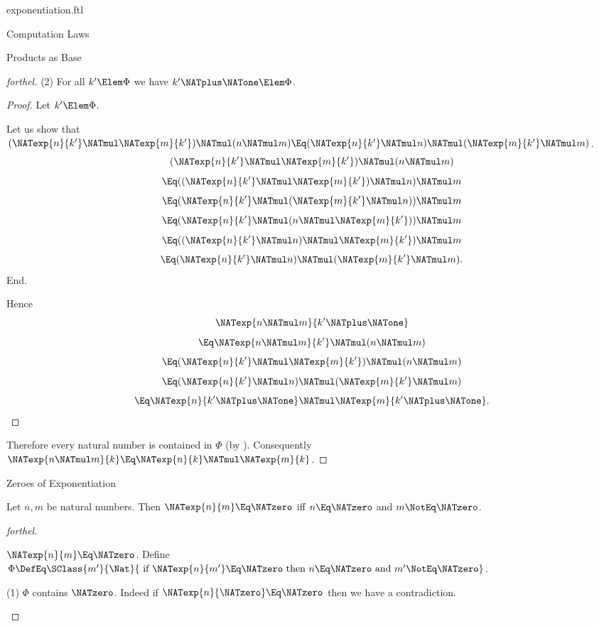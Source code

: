 \documentclass{stex}
\begin{document}
\begin{smodule}{exponentiation.ftl}
\begin{sfragment}{Computation Laws}
\begin{sfragment}{Products as Base}
\begin{proof}[forthel]
      (2) For all $k' \Elem \Phi$ we have $k' \NATplus \NATone \Elem \Phi$.
      \begin{proof}
        Let $k' \Elem \Phi$.

        Let us show that $(\NATexp{n}{k'} \NATmul \NATexp{m}{k'}) \NATmul (n \NATmul m) \Eq (\NATexp{n}{k'} \NATmul n) \NATmul (\NATexp{m}{k'} \NATmul m)$.
          \[  (\NATexp{n}{k'} \NATmul \NATexp{m}{k'}) \NATmul (n \NATmul m)       \]
          \[    \Eq ((\NATexp{n}{k'} \NATmul \NATexp{m}{k'}) \NATmul n) \NATmul m   \]
          \[    \Eq (\NATexp{n}{k'} \NATmul (\NATexp{m}{k'} \NATmul n)) \NATmul m   \]
          \[    \Eq (\NATexp{n}{k'} \NATmul (n \NATmul \NATexp{m}{k'})) \NATmul m   \]
          \[    \Eq ((\NATexp{n}{k'} \NATmul n) \NATmul \NATexp{m}{k'}) \NATmul m   \]
          \[    \Eq (\NATexp{n}{k'} \NATmul n) \NATmul (\NATexp{m}{k'} \NATmul m).  \]
        End.

        Hence
        \[  \NATexp{n \NATmul m}{k' \NATplus \NATone}                          \]
        \[    \Eq \NATexp{n \NATmul m}{k'} \NATmul (n \NATmul m)        \]
        \[    \Eq (\NATexp{n}{k'} \NATmul \NATexp{m}{k'}) \NATmul (n \NATmul m)   \]
        \[    \Eq (\NATexp{n}{k'} \NATmul n) \NATmul (\NATexp{m}{k'} \NATmul m)   \]
        \[    \Eq \NATexp{n}{k' \NATplus \NATone} \NATmul \NATexp{m}{k' \NATplus \NATone}.              \]
      \end{proof}

      Therefore every natural number is contained in $\Phi$ (by ).
      Consequently $\NATexp{n \NATmul m}{k} \Eq \NATexp{n}{k} \NATmul \NATexp{m}{k}$.
    \end{proof}
  \end{sfragment}

  \begin{sfragment}{Zeroes of Exponentiation}
    \begin{proposition}[forthel]
      Let $n, m$ be natural numbers.
      Then $\NATexp{n}{m} \Eq \NATzero$ iff $n \Eq \NATzero$ and $m \NotEq \NATzero$.
    \end{proposition}
    \begin{proof}[forthel]
      \begin{case}{$\NATexp{n}{m} \Eq \NATzero$.}
        Define $\Phi \DefEq \SClass{m'}{\Nat}{\text{ if }\NATexp{n}{m'} \Eq \NATzero\text{ then }n \Eq \NATzero\text{ and }m' \NotEq \NATzero}$.

        (1) $\Phi$ contains $\NATzero$.
        Indeed if $\NATexp{n}{\NATzero} \Eq \NATzero$ then we have a contradiction.


\end{case}
\end{proof}
\end{sfragment}
\end{sfragment}
\end{smodule}
\end{document}
